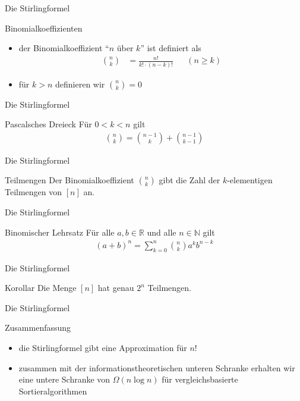\documentclass[aspectratio=1610, 11pt]{beamer}
\newcommand\NN{\mathbb N}
\newcommand\RR{\mathbb R}
\begin{document}
\begin{frame}{Die Stirlingformel}
	\begin{block}{Binomialkoeffizienten}
		\begin{itemize}
			\item der \alert{Binomialkoeffizient} ``$n$ \"uber $k$'' ist definiert als
				\begin{align*}
					\binom nk&=\frac{n!}{k!\cdot(n-k)!}&&(n\geq k)
				\end{align*}
			\item f\"ur $k>n$ definieren wir $\binom nk=0$
		\end{itemize}
	\end{block}
\end{frame}

\begin{frame}{Die Stirlingformel}
	\begin{exampleblock}{Pascalsches Dreieck}
		F\"ur $0<k<n$ gilt
		\begin{align*}
			\binom nk=\binom{n-1}k+\binom{n-1}{k-1}
		\end{align*}
	\end{exampleblock}
\end{frame}

\begin{frame}{Die Stirlingformel}
	\begin{exampleblock}{Teilmengen}
		Der Binomialkoeffizient $\binom nk$ gibt die Zahl der $k$-elementigen Teilmengen von $[n]$ an.
	\end{exampleblock}
\end{frame}

\begin{frame}{Die Stirlingformel}
	\begin{block}{Binomischer Lehrsatz}
F\"ur alle $a,b\in\RR$ und alle $n\in\NN$ gilt
\begin{align*}
	(a+b)^n=\sum_{k=0}^n\binom nka^kb^{n-k}
\end{align*}
	\end{block}
\end{frame}

\begin{frame}{Die Stirlingformel}
	\begin{block}{Korollar}
		Die Menge $[n]$ hat genau $2^n$ Teilmengen.
	\end{block}
\end{frame}

\begin{frame}{Die Stirlingformel}
	\begin{exampleblock}{Zusammenfassung}
		\begin{itemize}
			\item die Stirlingformel gibt eine Approximation f\"ur $n!$
			\item zusammen mit der informationstheoretischen unteren Schranke erhalten wir eine untere Schranke von $\Omega(n\log n)$ f\"ur vergleichsbasierte Sortieralgorithmen
		\end{itemize}
	\end{exampleblock}
\end{frame}
\end{document}
